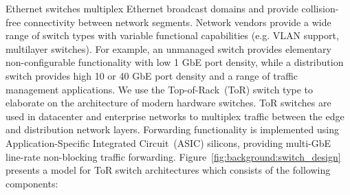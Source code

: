 Ethernet switches multiplex Ethernet broadcast domains and provide
collision-free connectivity between network segments.  Network vendors provide
a wide range of switch types with variable functional capabilities (e.g. VLAN
support, multilayer switches).  For example, an unmanaged switch provides
elementary non-configurable functionality with low 1 GbE port density, while a
distribution switch provides high 10 or 40 GbE port density and a range of
traffic management applications.  We use the Top-of-Rack~(ToR) switch type to
elaborate on the architecture of modern hardware switches.  ToR switches are
used in datacenter and enterprise networks to multiplex traffic between
the edge and distribution network layers. Forwarding functionality is
implemented  using Application-Specific Integrated Circuit~(ASIC) silicons,
providing multi-GbE line-rate non-blocking traffic forwarding.
Figure~\ref{fig:background:switch_design} presents a model for ToR switch architectures
which consists of the following components:

